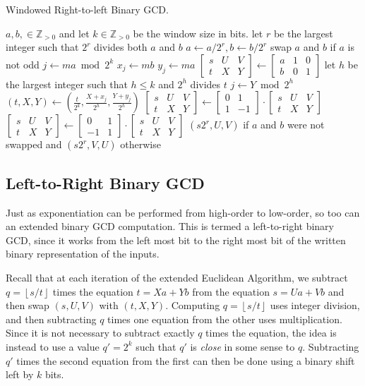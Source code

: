 \documentclass{ucalgthes1}
\theoremstyle{definition}
\newcommand{\ZZgtz}{\mathbb{Z}_{>0}}
\newcommand{\matrixtt}[4]{\left[ \begin{array}{rr} #1 & #2 \\ #3 & #4 \end{array} \right]}
\newcommand{\matrixThreeTwo}[6]{\left[ \begin{array}{rrr} #1 & #2 & #3 \\ #4 & #5 & #6 \end{array} \right]}
\newcommand{\floor}[1]{\left\lfloor #1 \right\rfloor}
\begin{document}
\begin{algorithm}[h]
\caption{Windowed Right-to-left Binary GCD.}
\label{alg:windowedR2lBinGcd}
\begin{algorithmic}[1]
\REQUIRE $a,b, \in \ZZgtz$ and let $k \in \ZZgtz$ be the window size in bits.
\STATE let $r$ be the largest integer such that $2^r$ divides both $a$ and $b$
\STATE $a \gets a / 2^r, b \gets b / 2^r$
\STATE swap $a$ and $b$ if $a$ is not odd
	\STATE $j \gets ma \bmod 2^k$
	\STATE $x_j \gets mb$
	\STATE $y_j \gets ma$
\ENDFOR
\STATE $\matrixThreeTwo{s}{U}{V}{t}{X}{Y} \gets \matrixThreeTwo{a}{1}{0}{b}{0}{1}$
		\STATE let $h$ be the largest integer such that $h \le k$ and $2^h$ divides $t$
		\STATE $j \gets Y \bmod 2^h$
		\STATE $(t, X, Y) \gets \left( \frac{t}{2^k}, \frac{X+x_j}{2^h}, \frac{Y+y_j}{2^h} \right)$  
	\ENDWHILE
		\STATE $\matrixThreeTwo{s}{U}{V}{t}{X}{Y} \gets \matrixtt{0}{1}{1}{-1} \cdot \matrixThreeTwo{s}{U}{V}{t}{X}{Y}$
	\ELSE
		\STATE $\matrixThreeTwo{s}{U}{V}{t}{X}{Y} \gets \matrixtt{0}{1}{-1}{1} \cdot \matrixThreeTwo{s}{U}{V}{t}{X}{Y}$
	\ENDIF
\ENDWHILE
\RETURN $(s2^r, U, V)$ if $a$ and $b$ were not swapped and $(s2^r, V, U)$ otherwise
\end{algorithmic}
\end{algorithm}

\subsection{Left-to-Right Binary GCD}

Just as exponentiation can be performed from high-order to low-order, so too can an extended binary GCD computation.  This is termed a left-to-right binary GCD, since it works from the left most bit to the right most bit of the written binary representation of the inputs.

Recall that at each iteration of the extended Euclidean Algorithm, we subtract $q = \floor{s/t}$ times the equation $t = Xa + Yb$ from the equation $s = Ua + Vb$ and then swap $(s, U, V)$ with $(t, X, Y)$.  Computing $q=\floor{s/t}$ uses integer division, and then subtracting $q$ times one equation from the other uses multiplication.  Since it is not necessary to subtract exactly $q$ times the equation, the idea is instead to use a value $q' = 2^k$ such that $q'$ is \emph{close} in some sense to $q$.  Subtracting $q'$ times the second equation from the first can then be done using a binary shift left by $k$ bits.
\end{document}
